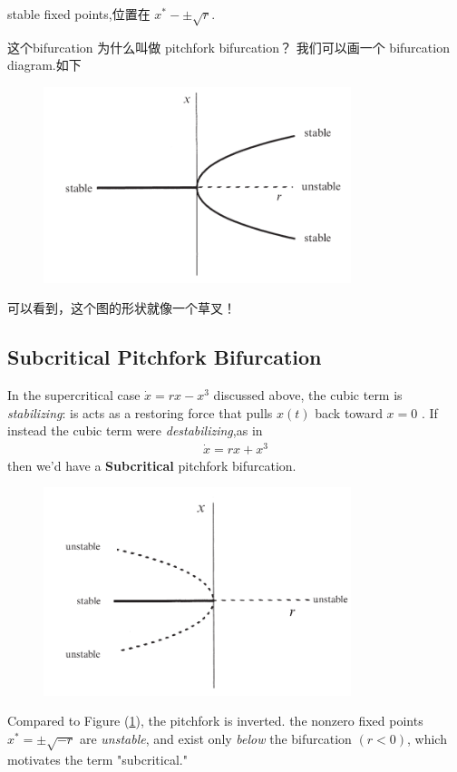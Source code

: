 stable fixed points,位置在 $ x^* - \pm \sqrt{r} $. 
\par 这个bifurcation 为什么叫做 pitchfork bifurcation？ 我们可以画一个 bifurcation diagram.如下
\begin{figure}[htbp]
    \centering
    \includegraphics[width=0.8\textwidth]{figures/Bifurcation-2.png}
    \caption{}
    \label{Bifurcation-f1}
\end{figure}
可以看到，这个图的形状就像一个草叉！
\subsection*{Subcritical Pitchfork Bifurcation}
In the supercritical case $ \dot{x} = rx - x^3 $ discussed above, the cubic term is \textit{stabilizing}:
is acts as a restoring force that pulls $ x(t) $ back toward $ x = 0 $ . If instead the cubic 
term were \textit{destabilizing},as in 
\begin{equation}
    \begin{aligned} 
    \dot{x} = rx + x^3
    \end{aligned} 
\end{equation}
then we'd have a \textbf{Subcritical} pitchfork bifurcation.
\begin{figure}[htbp]
    \centering
    \includegraphics[width=0.8\textwidth]{figures/Bifurcation-3.png}
    \caption{}
\end{figure}
Compared to Figure (\ref{Bifurcation-f1}), the pitchfork is inverted. the nonzero fixed points 
$ x^* = \pm \sqrt{-r} $  are \textit{unstable}, and exist only \textit{below} the bifurcation $ (r<0) $, 
which motivates the term "subcritical."
\section{}